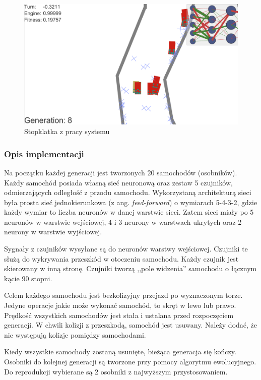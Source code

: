 \begin{figure}[h]
\begin{center}
\includegraphics[width=16cm]{resources/figures/samuelArtzDeepCars.png}
\caption{Stopklatka z pracy systemu}
\label{SamuelArtzDeepLearningCars}
\end{center}
\end{figure}

\subsubsection{Opis implementacji}
Na początku każdej generacji jest tworzonych 20 samochodów (osobników). Każdy samochód posiada własną sieć neuronową oraz zestaw 5 czujników, odmierzających odległość z przodu samochodu. Wykorzystaną architekturą sieci była prosta sieć jednokierunkowa (z ang. \textit{feed-forward}) o wymiarach 5-4-3-2, gdzie każdy wymiar to liczba neuronów w danej warstwie sieci. Zatem sieci miały po 5 neuronów w warstwie wejściowej, 4 i 3 neurony w warstwach ukrytych oraz 2 neurony w warstwie wyjściowej.

Sygnały z czujników wysyłane są do neuronów warstwy wejściowej.
Czujniki te służą do wykrywania przeszkód w otoczeniu samochodu.
Każdy czujnik jest skierowany w inną stronę.
Czujniki tworzą ,,pole widzenia'' samochodu o łącznym kącie 90 stopni.

Celem każdego samochodu jest bezkolizyjny przejazd po wyznaczonym torze.
Jedyne operacje jakie może wykonać samochód, to skręt w lewo lub prawo.
Prędkość wszystkich samochodów jest stała i ustalana przed rozpoczęciem generacji.
W chwili kolizji z przeszkodą, samochód jest usuwany. Należy dodać, że nie występują kolizje pomiędzy samochodami.

Kiedy wszystkie samochody zostaną usunięte, bieżąca generacja się kończy.
Osobniki do kolejnej generacji są tworzone przy pomocy algorytmu ewolucyjnego. Do reprodukcji wybierane są 2 osobniki z najwyższym przystosowaniem.


